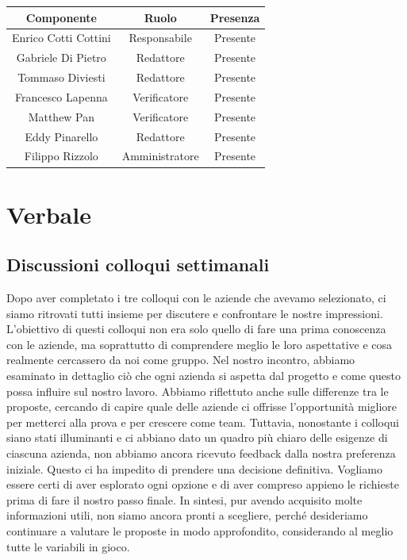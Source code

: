 \documentclass{article}
\begin{document}
\begin{tabular}{|c|c|c|}
    \hline
    \textbf{Componente} & \textbf{Ruolo} & \textbf{Presenza}\\
    \hline
    Enrico Cotti Cottini & Responsabile & Presente \\ 
    \hline
    Gabriele Di Pietro & Redattore & Presente \\ 
    \hline
    Tommaso Diviesti & Redattore & Presente \\ 
    \hline %
    Francesco Lapenna & Verificatore & Presente \\ 
    \hline
    Matthew Pan & Verificatore & Presente \\ 
    \hline %
    Eddy Pinarello & Redattore & Presente \\ 
    \hline %
    Filippo Rizzolo & Amministratore & Presente \\ 
    \hline %
\end{tabular}

\newpage
\section{Verbale}

\label{sec:verbale}
\subsection{Discussioni colloqui settimanali}
{\large
Dopo aver completato i tre colloqui con le aziende che avevamo selezionato, ci siamo ritrovati tutti insieme per discutere e confrontare le nostre impressioni. L'obiettivo di questi colloqui non era solo quello di fare una prima conoscenza con le aziende, ma soprattutto di comprendere meglio le loro aspettative e cosa realmente cercassero da noi come gruppo. \newline
Nel nostro incontro, abbiamo esaminato in dettaglio ciò che ogni azienda si aspetta dal progetto e come questo possa influire sul nostro lavoro. Abbiamo riflettuto anche sulle differenze tra le proposte, cercando di capire quale delle aziende ci offrisse l'opportunità migliore per metterci alla prova e per crescere come team.\newline
Tuttavia, nonostante i colloqui siano stati illuminanti e ci abbiano dato un quadro più chiaro delle esigenze di ciascuna azienda, non abbiamo ancora ricevuto feedback dalla nostra preferenza iniziale. Questo ci ha impedito di prendere una decisione definitiva. Vogliamo essere certi di aver esplorato ogni opzione e di aver compreso appieno le richieste prima di fare il nostro passo finale.\newline
In sintesi, pur avendo acquisito molte informazioni utili, non siamo ancora pronti a scegliere, perché desideriamo continuare a valutare le proposte in modo approfondito, considerando al meglio tutte le variabili in gioco. }
\end{document}
